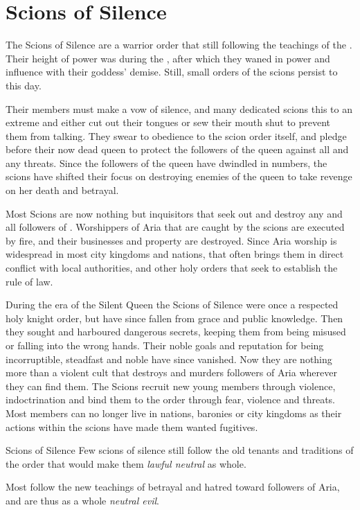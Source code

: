 \section{Scions of Silence}
\label{sec:Scions of Silence}

The Scions of Silence are a warrior order that still following the teachings
of the . Their height of power was during the
, after which they waned in power and influence
with their goddess' demise. Still, small orders of the scions persist to
this day.

Their members must make a vow of silence, and many dedicated scions this to an
extreme and either cut out their tongues or sew their mouth shut to prevent
them from talking. They swear to obedience to the scion order itself, and
pledge before their now dead queen to protect the followers of the queen
against all and any threats. Since the followers of the queen have dwindled in
numbers, the scions have shifted their focus on destroying enemies of the
queen to take revenge on her death and betrayal.

Most Scions are now nothing but inquisitors that seek out and destroy any and
all followers of . Worshippers of Aria that are caught by
the scions are executed by fire, and their businesses and property are
destroyed. Since Aria worship is widespread in most city kingdoms and nations,
that often brings them in direct conflict with local authorities, and other
holy orders that seek to establish the rule of law.

During the era of the Silent Queen the Scions of Silence were once a respected
holy knight order, but have since fallen from grace and public knowledge. Then
they sought and harboured dangerous secrets, keeping them from being misused
or falling into the wrong hands. Their noble goals and reputation for being
incorruptible, steadfast and noble have since vanished. Now they are nothing
more than a violent cult that destroys and murders followers of Aria wherever
they can find them. The Scions recruit new young members through violence,
indoctrination and bind them to the order through fear, violence and
threats. Most members can no longer live in nations, baronies or city kingdoms
as their actions within the scions have made them wanted fugitives.

\begin{35e}{Scions of Silence}
  Few scions of silence still follow the old tenants and traditions of the order
  that would make them \emph{lawful neutral} as whole.

  Most follow the new teachings of betrayal and hatred toward followers of Aria,
  and are thus as a whole \emph{neutral evil}.
\end{35e}
